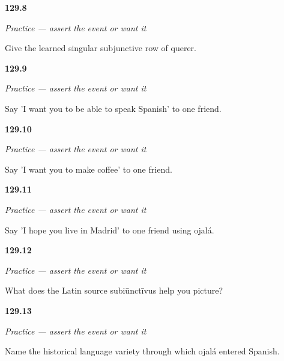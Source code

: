 \noindent\begin{minipage}[t]{\linewidth}
\raggedright
\hypertarget{review-ES-C18-practice-querer}{\textbf{129.8}} \emph{Practice — assert the event or want it}\par
\small Give the learned singular subjunctive row of querer.
\end{minipage}\par\medskip

\noindent\begin{minipage}[t]{\linewidth}
\raggedright
\hypertarget{review-ES-C18-practice-poder}{\textbf{129.9}} \emph{Practice — assert the event or want it}\par
\small Say 'I want you to be able to speak Spanish' to one friend.
\end{minipage}\par\medskip

\noindent\begin{minipage}[t]{\linewidth}
\raggedright
\hypertarget{review-ES-C18-practice-hacer}{\textbf{129.10}} \emph{Practice — assert the event or want it}\par
\small Say 'I want you to make coffee' to one friend.
\end{minipage}\par\medskip

\noindent\begin{minipage}[t]{\linewidth}
\raggedright
\hypertarget{review-ES-C18-practice-ojala}{\textbf{129.11}} \emph{Practice — assert the event or want it}\par
\small Say 'I hope you live in Madrid' to one friend using ojalá.
\end{minipage}\par\medskip

\noindent\begin{minipage}[t]{\linewidth}
\raggedright
\hypertarget{review-ES-C18-practice-subjunctive-name}{\textbf{129.12}} \emph{Practice — assert the event or want it}\par
\small What does the Latin source subiūnctīvus help you picture?
\end{minipage}\par\medskip

\noindent\begin{minipage}[t]{\linewidth}
\raggedright
\hypertarget{review-ES-C18-practice-ojala-source}{\textbf{129.13}} \emph{Practice — assert the event or want it}\par
\small Name the historical language variety through which ojalá entered Spanish.
\end{minipage}\par\medskip

